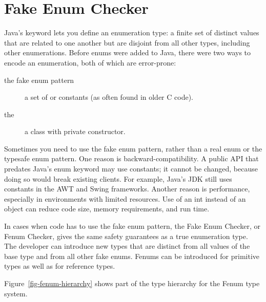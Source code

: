 \htmlhr
\chapter{Fake Enum Checker\label{fenum-checker}}

Java's 
keyword lets you define an enumeration type: a finite set of distinct values
that are related to one another but are disjoint from all other
types, including other enumerations.
Before enums were added to Java, there were two ways to encode an
enumeration, both of which are error-prone:

\begin{description}
\item[the fake enum pattern]  a set of  or 
  constants (as often found in older C code).

\item[the ]  a class with private constructor.
\end{description}

Sometimes you need to use the fake enum pattern,
rather than a real enum or the typesafe enum pattern.
%
One reason is backward-compatibility.  A public API that predates Java's
enum keyword may use  constants; it cannot be changed, because
doing so would break existing clients.  For example, Java's JDK still uses
 constants in the AWT and Swing frameworks.
%
Another reason is performance, especially in environments with limited
resources.  Use of an int instead of an object can 
reduce code size, memory requirements, and run time.

In cases when code has to use the fake enum pattern, the Fake Enum Checker,
or Fenum Checker, gives the same safety guarantees as a true enumeration type. 
The developer can introduce new types that are distinct from all values of the
base type and from all other fake enums. Fenums can be introduced for
primitive types as well as for reference types.

Figure~\ref{fig-fenum-hierarchy} shows part of the type hierarchy for the
Fenum type system.

